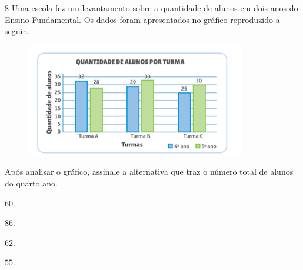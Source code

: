 
\num{8} Uma escola fez um levantamento sobre a quantidade de alunos em dois
anos do Ensino Fundamental. Os dados foram apresentados no gráfico reproduzido
a seguir.

\begin{figure}
\centering\includegraphics[width=3.78125in,height=1.94792in]{./imgSAEB_6_MAT/media/image110.png}
\end{figure}

Após analisar o gráfico, assinale a alternativa que traz o
número total de alunos do quarto ano.

\begin{escolha}
\item $60$.
\item $86$.
\item $62$.
\item $55$.
\end{escolha}


